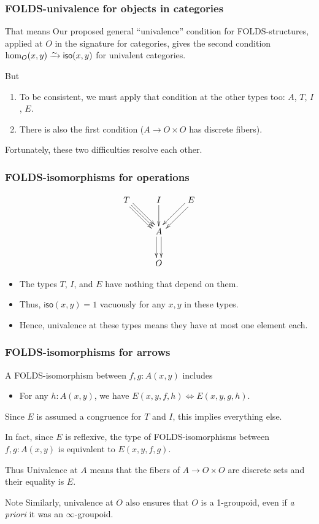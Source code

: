 \documentclass{beamer}
\begin{document}
\begin{frame}
  \frametitle{FOLDS-univalence for objects in categories}
  \begin{block}{That means}
    Our proposed general ``univalence'' condition for FOLDS-structures, applied at $O$ in the signature for categories, gives the second condition $\hom_O(x,y) \toiso \mathsf{iso}(x,y)$ for univalent categories.
  \end{block}
  \begin{block}{But}
    \begin{enumerate}
    \item To be consistent, we must apply that condition at the other types too: $A$, $T$, $I$, $E$.
    \item There is also the first condition ($A\to O\times O$ has discrete fibers).
    \end{enumerate}
  \end{block}
  Fortunately, these two difficulties resolve each other.
\end{frame}

\begin{frame}
  \frametitle{FOLDS-isomorphisms for operations}
  \[
  \vcenter{\xymatrix{
      T \ar[dr] \ar@<1mm>[dr] \ar@<-1mm>[dr] & I \ar[d] & E \ar@<1mm>[dl] \ar@<-1mm>[dl] \\
      & A \ar@<1mm>[d] \ar@<-1mm>[d] \\
      & O}}
  \]
  \begin{itemize}
  \item The types $T$, $I$, and $E$ have nothing that depend on them.
  \item Thus, $\mathsf{iso}(x,y)=1$ vacuously for any $x,y$ in these types.
  \item Hence, univalence at these types means they have at most one element each.
  \end{itemize}
\end{frame}

\begin{frame}
  \frametitle{FOLDS-isomorphisms for arrows}
  A FOLDS-isomorphism between $f,g:A(x,y)$ includes
  \begin{itemize}
  \item For any $h:A(x,y)$, we have $E(x,y,f,h) \iff E(x,y,g,h)$.
  \end{itemize}
  Since $E$ is assumed a congruence for $T$ and $I$, this implies everything else.

  \pause\medskip
  In fact, since $E$ is reflexive, the type of FOLDS-isomorphisms between $f,g:A(x,y)$ is equivalent to $E(x,y,f,g)$.
  \begin{block}{Thus}
    Univalence at $A$ means that the fibers of $A\to O\times O$ are discrete sets and their equality is $E$.
  \end{block}
  \pause
  \begin{block}{Note}
    Similarly, univalence at $O$ also ensures that $O$ is a 1-groupoid, even if \textit{a priori} it was an $\infty$-groupoid.
  \end{block}
\end{frame}
\end{document}
